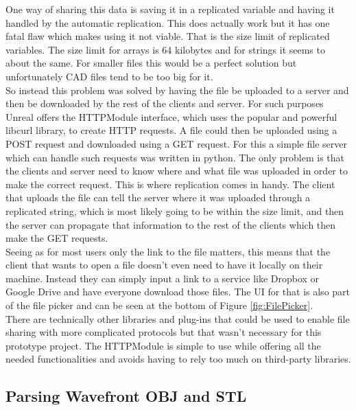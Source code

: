 One way of sharing this data is saving it in a replicated variable and having it handled by the automatic replication. This does actually work but it has one fatal flaw which makes using it not viable. That is the size limit of replicated variables. The size limit for arrays is 64 kilobytes and for strings it seems to about the same. For smaller files this would be a perfect solution but unfortunately CAD files tend to be too big for it.\\
So instead this problem was solved by having the file be uploaded to a server and then be downloaded by the rest of the clients and server. For such purposes Unreal offers the HTTPModule interface, which uses the popular and powerful libcurl library, to create HTTP requests. A file could then be uploaded using a POST request and downloaded using a GET request. For this a simple file server which can handle such requests was written in python. The only problem is that the clients and server need to know where and what file was uploaded in order to make the correct request. This is where replication comes in handy. The client that uploads the file can tell the server where it was uploaded through a replicated string, which is most likely going to be within the size limit, and then the server can propagate that information to the rest of the clients which then make the GET requests.\\
Seeing as for most users only the link to the file matters, this means that the client that wants to open a file doesn't even need to have it locally on their machine. Instead they can simply input a link to a service like Dropbox or Google Drive and have everyone download those files. The UI for that is also part of the file picker and can be seen at the bottom of Figure \ref{fig:FilePicker}.\\
There are technically other libraries and plug-ins that could be used to enable file sharing with more complicated protocols but that wasn't necessary for this prototype project. The HTTPModule is simple to use while offering all the needed functionalities and avoids having to rely too much on third-party libraries.


\subsection{Parsing Wavefront OBJ and STL}

